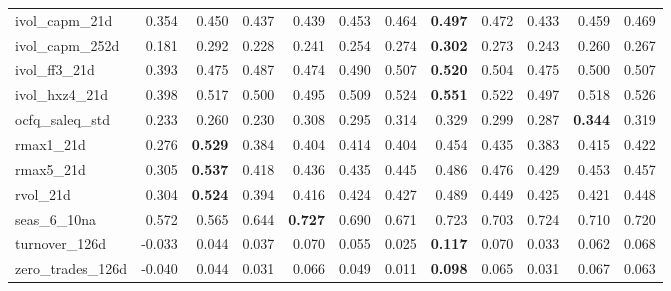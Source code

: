 \begin{landscape}
\begin{longtable}{>{\raggedright\arraybackslash}p{2.6cm}rrrrrrrrrrr}
ivol\_capm\_21d & 0.354 & 0.450 & 0.437 & 0.439 & \cellcolor{blue!10}0.453 & \cellcolor{blue!10}0.464 & \textbf{\cellcolor{blue!10}0.497} & \cellcolor{blue!10}0.472 & 0.433 & \cellcolor{blue!10}0.459 & \cellcolor{blue!10}0.469 \\
ivol\_capm\_252d & 0.181 & 0.292 & 0.228 & 0.241 & 0.254 & 0.274 & \textbf{\cellcolor{blue!10}0.302} & 0.273 & 0.243 & 0.260 & 0.267 \\
ivol\_ff3\_21d & 0.393 & 0.475 & \cellcolor{blue!10}0.487 & 0.474 & \cellcolor{blue!10}0.490 & \cellcolor{blue!10}0.507 & \textbf{\cellcolor{blue!10}0.520} & \cellcolor{blue!10}0.504 & 0.475 & \cellcolor{blue!10}0.500 & \cellcolor{blue!10}0.507 \\
ivol\_hxz4\_21d & 0.398 & 0.517 & 0.500 & 0.495 & 0.509 & \cellcolor{blue!10}0.524 & \textbf{\cellcolor{blue!10}0.551} & \cellcolor{blue!10}0.522 & 0.497 & \cellcolor{blue!10}0.518 & \cellcolor{blue!10}0.526 \\
ocfq\_saleq\_std & 0.233 & 0.260 & 0.230 & \cellcolor{blue!10}0.308 & \cellcolor{blue!10}0.295 & \cellcolor{blue!10}0.314 & \cellcolor{blue!10}0.329 & \cellcolor{blue!10}0.299 & \cellcolor{blue!10}0.287 & \textbf{\cellcolor{blue!10}0.344} & \cellcolor{blue!10}0.319 \\
rmax1\_21d & 0.276 & \textbf{0.529} & 0.384 & 0.404 & 0.414 & 0.404 & 0.454 & 0.435 & 0.383 & 0.415 & 0.422 \\
rmax5\_21d & 0.305 & \textbf{0.537} & 0.418 & 0.436 & 0.435 & 0.445 & 0.486 & 0.476 & 0.429 & 0.453 & 0.457 \\
rvol\_21d & 0.304 & \textbf{0.524} & 0.394 & 0.416 & 0.424 & 0.427 & 0.489 & 0.449 & 0.425 & 0.421 & 0.448 \\
seas\_6\_10na & 0.572 & 0.565 & \cellcolor{blue!10}0.644 & \textbf{\cellcolor{blue!10}0.727} & \cellcolor{blue!10}0.690 & \cellcolor{blue!10}0.671 & \cellcolor{blue!10}0.723 & \cellcolor{blue!10}0.703 & \cellcolor{blue!10}0.724 & \cellcolor{blue!10}0.710 & \cellcolor{blue!10}0.720 \\
turnover\_126d & -0.033 & 0.044 & 0.037 & \cellcolor{blue!10}0.070 & \cellcolor{blue!10}0.055 & 0.025 & \textbf{\cellcolor{blue!10}0.117} & \cellcolor{blue!10}0.070 & 0.033 & \cellcolor{blue!10}0.062 & \cellcolor{blue!10}0.068 \\
zero\_trades\_126d & -0.040 & 0.044 & 0.031 & \cellcolor{blue!10}0.066 & \cellcolor{blue!10}0.049 & 0.011 & \textbf{\cellcolor{blue!10}0.098} & \cellcolor{blue!10}0.065 & 0.031 & \cellcolor{blue!10}0.067 & \cellcolor{blue!10}0.063 \\

\end{longtable}
\end{landscape}
